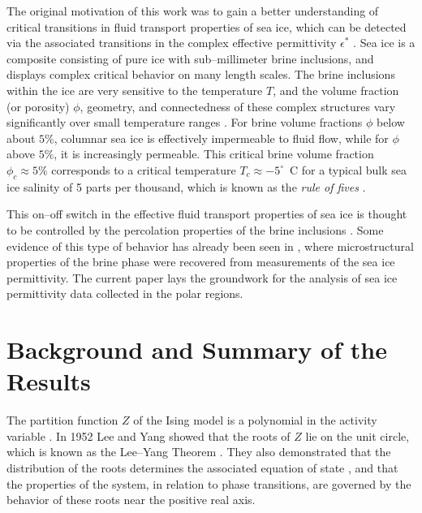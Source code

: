 \documentclass[english,12pt,jmp,graphicx]{revtex4-1}
\begin{document}
The original motivation of this work was to gain a better
understanding of critical transitions in fluid transport properties
of sea ice, which can be detected via the associated transitions in
the complex effective permittivity $\epsilon^*$ \cite{Gully:PhysB:357}. Sea
ice is a composite 
consisting of pure ice with sub--millimeter brine inclusions, and
displays complex critical behavior on many length scales. The brine
inclusions within the ice are very sensitive to the temperature $T$,
and the volume fraction (or porosity) $\phi$, geometry, and connectedness
of these complex structures vary significantly over small temperature
ranges \cite{Golden:S-2238}. For brine volume fractions $\phi$ below
about $5\%$, columnar sea ice is effectively impermeable to fluid flow,
while for $\phi$ above $5\%$, it is increasingly permeable. This critical
brine volume fraction $\phi_c\approx5\%$ corresponds to a critical temperature
$T_c\approx-5^{\circ}$~C for a typical bulk sea ice salinity of 5 parts per
thousand, which is known as the {\it rule of fives}
\cite{Golden:S-2238,Kusy:N-58,Kusy:JAP-5301}.  

This on--off switch in the effective fluid transport properties of sea
ice is thought to be controlled by the percolation properties of the
brine inclusions \cite{Golden:S-2238}. Some evidence of this type of
behavior has already been seen in \cite{Gully:PhysB:357}, where
microstructural properties of the brine phase were recovered from
measurements of the sea ice permittivity. The current paper lays
the groundwork for the analysis of sea ice permittivity data collected
in the polar regions.    
\section{Background and Summary of the Results}\label{sec:Background}
%
The partition function $Z$ of the Ising model is a polynomial
in the activity variable \cite{Lee:PR:411,Baker-1990,Ruelle-1969,Ruelle:AM:589}.
In 1952 Lee and Yang \cite{Lee:PR:411} showed that the 
roots of $Z$ lie on the unit circle, which is
known as the Lee--Yang Theorem \cite{Lee:PR:411,Ruelle-1969}.
They also demonstrated that 
the distribution of the roots determines 
the associated equation of state
\cite{Yang:PR:404}, and that the properties of 
the system, in relation to phase transitions, are governed by the
behavior of these roots near the positive real axis.   
\end{document}
